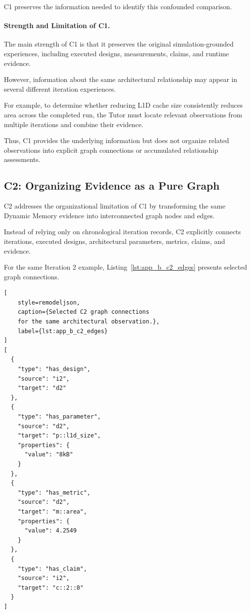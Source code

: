 C1 preserves the information
needed to identify this
confounded comparison.

\paragraph{Strength and Limitation of C1.}

The main strength of C1 is that
it preserves the original
simulation-grounded experiences,
including executed designs,
measurements, claims, and
runtime evidence.

However, information about
the same architectural relationship
may appear in several different
iteration experiences.

For example, to determine whether
reducing L1D cache size consistently
reduces area across the completed
run, the Tutor must locate
relevant observations from
multiple iterations and
combine their evidence.

Thus, C1 provides the underlying
information but does not organize
related observations into
explicit graph connections
or accumulated relationship
assessments.

\subsection{C2: Organizing Evidence as a Pure Graph}

C2 addresses the organizational
limitation of C1 by transforming
the same Dynamic Memory evidence
into interconnected graph nodes
and edges.

Instead of relying only on
chronological iteration records,
C2 explicitly connects
iterations, executed designs,
architectural parameters,
metrics, claims, and evidence.

For the same Iteration 2 example,
Listing~\ref{lst:app_b_c2_edges}
presents selected graph connections.

\begin{lstlisting}[
    style=remodeljson,
    caption={Selected C2 graph connections
    for the same architectural observation.},
    label={lst:app_b_c2_edges}
]
[
  {
    "type": "has_design",
    "source": "i2",
    "target": "d2"
  },
  {
    "type": "has_parameter",
    "source": "d2",
    "target": "p::l1d_size",
    "properties": {
      "value": "8kB"
    }
  },
  {
    "type": "has_metric",
    "source": "d2",
    "target": "m::area",
    "properties": {
      "value": 4.2549
    }
  },
  {
    "type": "has_claim",
    "source": "i2",
    "target": "c::2::0"
  }
]
\end{lstlisting}

